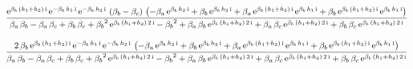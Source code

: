 \documentclass[9pt]{article}
\begin{document}
  \begin{equation}
    \centering
    \frac{\mathrm{e}^{\mathrm{\beta}_{b}\, \left(h_{1} + h_{2}\right)\, \mathrm{i}}\, \mathrm{e}^{- \mathrm{\beta}_{b}\, h_{1}\, \mathrm{i}}\, \mathrm{e}^{- \mathrm{\beta}_{b}\, h_{2}\, \mathrm{i}}\, \left(\mathrm{\beta}_{b} - \mathrm{\beta}_{c}\right)\, \left( - \mathrm{\beta}_{a}\, \mathrm{e}^{\mathrm{\beta}_{b}\, h_{2}\, \mathrm{i}} + \mathrm{\beta}_{b}\, \mathrm{e}^{\mathrm{\beta}_{b}\, h_{2}\, \mathrm{i}} + \mathrm{\beta}_{a}\, \mathrm{e}^{\mathrm{\beta}_{b}\, \left(h_{1} + h_{2}\right)\, \mathrm{i}}\, \mathrm{e}^{\mathrm{\beta}_{b}\, h_{1}\, \mathrm{i}} + \mathrm{\beta}_{b}\, \mathrm{e}^{\mathrm{\beta}_{b}\, \left(h_{1} + h_{2}\right)\, \mathrm{i}}\, \mathrm{e}^{\mathrm{\beta}_{b}\, h_{1}\, \mathrm{i}}\right)}{\mathrm{\beta}_{a}\, \mathrm{\beta}_{b} - \mathrm{\beta}_{a}\, \mathrm{\beta}_{c} + \mathrm{\beta}_{b}\, \mathrm{\beta}_{c} + {\mathrm{\beta}_{b}}^2\, \mathrm{e}^{\mathrm{\beta}_{b}\, \left(h_{1} + h_{2}\right)\, 2\, \mathrm{i}} - {\mathrm{\beta}_{b}}^2 + \mathrm{\beta}_{a}\, \mathrm{\beta}_{b}\, \mathrm{e}^{\mathrm{\beta}_{b}\, \left(h_{1} + h_{2}\right)\, 2\, \mathrm{i}} + \mathrm{\beta}_{a}\, \mathrm{\beta}_{c}\, \mathrm{e}^{\mathrm{\beta}_{b}\, \left(h_{1} + h_{2}\right)\, 2\, \mathrm{i}} + \mathrm{\beta}_{b}\, \mathrm{\beta}_{c}\, \mathrm{e}^{\mathrm{\beta}_{b}\, \left(h_{1} + h_{2}\right)\, 2\, \mathrm{i}}}
    \label{eq:X3}
  \end{equation}


  \begin{equation}
    \centering
    \frac{2\, \mathrm{\beta}_{b}\, \mathrm{e}^{\mathrm{\beta}_{b}\, \left(h_{1} + h_{2}\right)\, \mathrm{i}}\, \mathrm{e}^{- \mathrm{\beta}_{b}\, h_{1}\, \mathrm{i}}\, \mathrm{e}^{- \mathrm{\beta}_{b}\, h_{2}\, \mathrm{i}}\, \left( - \mathrm{\beta}_{a}\, \mathrm{e}^{\mathrm{\beta}_{b}\, h_{2}\, \mathrm{i}} + \mathrm{\beta}_{b}\, \mathrm{e}^{\mathrm{\beta}_{b}\, h_{2}\, \mathrm{i}} + \mathrm{\beta}_{a}\, \mathrm{e}^{\mathrm{\beta}_{b}\, \left(h_{1} + h_{2}\right)\, \mathrm{i}}\, \mathrm{e}^{\mathrm{\beta}_{b}\, h_{1}\, \mathrm{i}} + \mathrm{\beta}_{b}\, \mathrm{e}^{\mathrm{\beta}_{b}\, \left(h_{1} + h_{2}\right)\, \mathrm{i}}\, \mathrm{e}^{\mathrm{\beta}_{b}\, h_{1}\, \mathrm{i}}\right)}{\mathrm{\beta}_{a}\, \mathrm{\beta}_{b} - \mathrm{\beta}_{a}\, \mathrm{\beta}_{c} + \mathrm{\beta}_{b}\, \mathrm{\beta}_{c} + {\mathrm{\beta}_{b}}^2\, \mathrm{e}^{\mathrm{\beta}_{b}\, \left(h_{1} + h_{2}\right)\, 2\, \mathrm{i}} - {\mathrm{\beta}_{b}}^2 + \mathrm{\beta}_{a}\, \mathrm{\beta}_{b}\, \mathrm{e}^{\mathrm{\beta}_{b}\, \left(h_{1} + h_{2}\right)\, 2\, \mathrm{i}} + \mathrm{\beta}_{a}\, \mathrm{\beta}_{c}\, \mathrm{e}^{\mathrm{\beta}_{b}\, \left(h_{1} + h_{2}\right)\, 2\, \mathrm{i}} + \mathrm{\beta}_{b}\, \mathrm{\beta}_{c}\, \mathrm{e}^{\mathrm{\beta}_{b}\, \left(h_{1} + h_{2}\right)\, 2\, \mathrm{i}}}
    \label{eq:X4}
  \end{equation}
\end{document}
